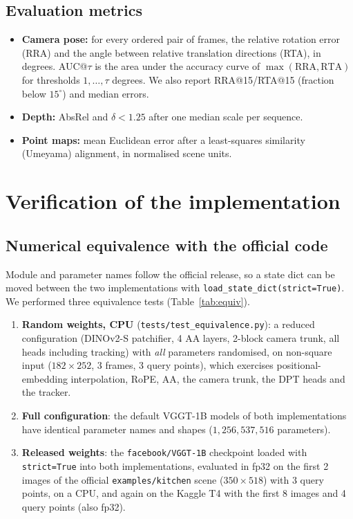 \documentclass[11pt,a4paper]{article}
\begin{document}
\subsection{Evaluation metrics}
\label{sec:metrics}
\begin{itemize}[leftmargin=*,itemsep=1pt]
  \item \textbf{Camera pose:} for every ordered pair of frames, the relative rotation error (RRA) and the angle between
        relative translation directions (RTA), in degrees. AUC@$\tau$ is the area under the accuracy curve of
        $\max(\text{RRA},\text{RTA})$ for thresholds $1,\dots,\tau$ degrees. We also report RRA@15/RTA@15 (fraction
        below $15^\circ$) and median errors.
  \item \textbf{Depth:} AbsRel and $\delta < 1.25$ after one median scale per sequence.
  \item \textbf{Point maps:} mean Euclidean error after a least-squares similarity (Umeyama) alignment, in normalised
        scene units.
\end{itemize}

\section{Verification of the implementation}
\label{sec:verify}

\subsection{Numerical equivalence with the official code}

Module and parameter names follow the official release, so a state dict can be moved between the two implementations
with \texttt{load\_state\_dict(strict=True)}. We performed three equivalence tests (Table~\ref{tab:equiv}).

\begin{enumerate}[leftmargin=*,itemsep=1pt]
  \item \textbf{Random weights, CPU} (\texttt{tests/test\_equivalence.py}): a reduced configuration (DINOv2-S patchifier,
        4 AA layers, 2-block camera trunk, all heads including tracking) with \emph{all} parameters randomised, on non-square
        input ($182\times252$, 3 frames, 3 query points), which exercises positional-embedding interpolation, RoPE, AA, the
        camera trunk, the DPT heads and the tracker.
  \item \textbf{Full configuration}: the default VGGT-1B models of both implementations have identical parameter names and
        shapes ($1{,}256{,}537{,}516$ parameters).
  \item \textbf{Released weights}: the \texttt{facebook/VGGT-1B} checkpoint loaded with \texttt{strict=True} into both
        implementations, evaluated in fp32 on the first 2 images of the official \texttt{examples/kitchen} scene
        ($350\times518$) with 3 query points, on a CPU, and again on the Kaggle T4 with the first 8 images and 4 query
        points (also fp32).
\end{enumerate}
\end{document}

